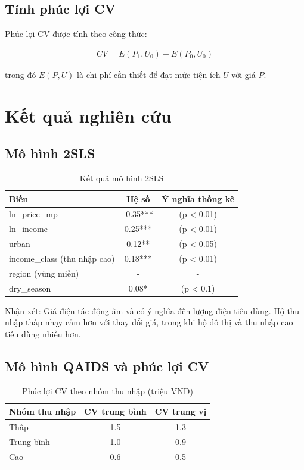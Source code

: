 \documentclass[12pt,a4paper]{article}
\begin{document}
	\subsection{Tính phúc lợi CV}
	Phúc lợi CV được tính theo công thức:
	
	\begin{align*}
		CV = E(P_1, U_0) - E(P_0, U_0)
	\end{align*}
	
	trong đó $E(P,U)$ là chi phí cần thiết để đạt mức tiện ích $U$ với giá $P$.
	
	\section{Kết quả nghiên cứu}
	
	\subsection{Mô hình 2SLS}
	\begin{table}[H]
		\centering
		\caption{Kết quả mô hình 2SLS}
		\begin{tabular}{lcc}
			\toprule
			Biến & Hệ số & Ý nghĩa thống kê \\
			\midrule
			ln\_price\_mp & -0.35*** & (p < 0.01) \\
			ln\_income & 0.25*** & (p < 0.01) \\
			urban & 0.12** & (p < 0.05) \\
			income\_class (thu nhập cao) & 0.18*** & (p < 0.01) \\
			region (vùng miền) & - & - \\
			dry\_season & 0.08* & (p < 0.1) \\
			\bottomrule
		\end{tabular}
	\end{table}
	
	Nhận xét: Giá điện tác động âm và có ý nghĩa đến lượng điện tiêu dùng. Hộ thu nhập thấp nhạy cảm hơn với thay đổi giá, trong khi hộ đô thị và thu nhập cao tiêu dùng nhiều hơn.
	
	\subsection{Mô hình QAIDS và phúc lợi CV}
	\begin{table}[H]
		\centering
		\caption{Phúc lợi CV theo nhóm thu nhập (triệu VNĐ)}
		\begin{tabular}{lcc}
			\toprule
			Nhóm thu nhập & CV trung bình & CV trung vị \\
			\midrule
			Thấp & 1.5 & 1.3 \\
			Trung bình & 1.0 & 0.9 \\
			Cao & 0.6 & 0.5 \\
			\bottomrule
		\end{tabular}
	\end{table}
	
\end{document}
